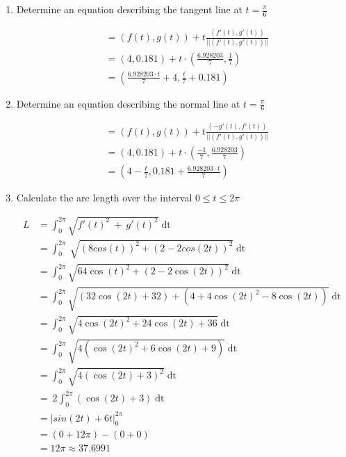 \documentclass[a4paper,11pt]{article}
\begin{document}
\begin{enumerate}
\begin{enumerate}
        \item Determine an equation describing the tangent line at $t = \frac{\pi}{6}$
        
        \begin{align*}
            &= \left( f(t), g(t) \right) + t \frac{(f'(t), g'(t))}{||(f'(t), g'(t))||}\\
            &= (4, 0.181) + t \cdot \left( \frac{6.928203}{7}, \frac{1}{7}\right)\\
            &= \left( \frac{6.928203 \cdot t}{7} + 4, \frac{t}{7} + 0.181 \right)
        \end{align*}

        \item Determine an equation describing the normal line at $t = \frac{\pi}{6}$

        \begin{align*}
            &= \left( f(t), g(t) \right) + t \frac{(-g'(t), f'(t))}{||(f'(t), g'(t))||}\\
            &= (4, 0.181) + t \cdot \left( \frac{-1}{7}, \frac{6.928203}{7}\right)\\
            &= \left( 4 - \frac{t}{7},  0.181 +\frac{6.928203 \cdot t}{7} \right)
        \end{align*}

        \item Calculate the arc length over the interval $0 \leq t \leq 2\pi$
        
        \begin{align*}
            L &= \int_{0}^{2\pi}\sqrt{f'\left(t\right)^{2}\ +\ g'\left(t\right)^{2}}\operatorname{dt}\\
            &= \int _0^{2\pi }\:\sqrt{\left(8cos\left(t\right)\right)^2+\left(2-2cos\left(2t\right)\right)^2} \operatorname{dt}\\
            &= \int_{0}^{2\pi}\sqrt{64\cos\left(t\right)^{2}+\left(2-2\cos\left(2t\right)\right)^{2}}\operatorname{dt}\\
            &= \int_{0}^{2\pi}\sqrt{\left(32\cos\left(2t\right)+32\right)+\left(4+4\cos\left(2t\right)^{2}-8\cos\left(2t\right)\right)}\operatorname{dt}\\
            &=\int_{0}^{2\pi}\sqrt{4\cos\left(2t\right)^{2}+24\cos\left(2t\right)+36}\operatorname{dt}\\
            &=\int_{0}^{2\pi}\sqrt{4\left(\cos\left(2t\right)^{2}+6\cos\left(2t\right)+9\right)}\operatorname{dt}\\
            &= \int_{0}^{2\pi}\sqrt{4\left(\cos\left(2t\right)+3\right)^{2}}\operatorname{dt}\\
            &= \ 2\int_{0}^{2\pi}\left(\cos\left(2t\right)+3\right)\operatorname{dt}\\
            &= \Big| sin(2t) + 6t \Big|^{2\pi}_{0}\\
            &= (0 + 12\pi) - (0 + 0)\\
            &= 12\pi \approx 37.6991\\
        \end{align*}


\end{enumerate}
\end{enumerate}
\end{document}
